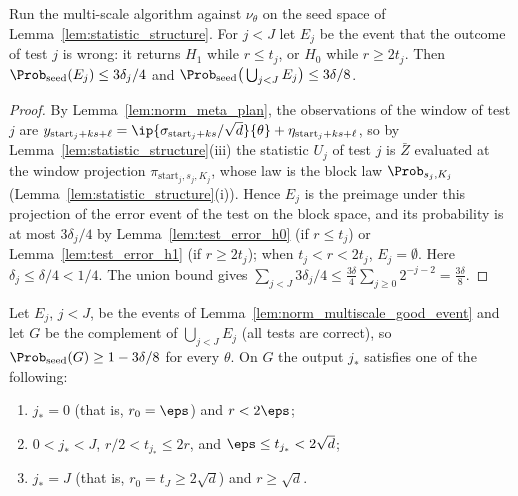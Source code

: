 \begin{lemma}\label{lem:norm_multiscale_good_event}
\leanok
{}
Run the multi-scale algorithm against $\nu_\theta$ on the seed space of
Lemma~\ref{lem:statistic_structure}. For $j < J$ let $E_j$ be the event that the outcome of
test $j$ is wrong: it returns $H_1$ while $r \le t_j$, or $H_0$ while $r \ge 2t_j$.
Then $\Prob_{\mathrm{seed}}(E_j) \le 3\delta_j/4$ and
$\Prob_{\mathrm{seed}}\big( \bigcup_{j<J} E_j \big) \le 3\delta/8$.
\end{lemma}

\begin{proof}
\leanok
{}
By Lemma~\ref{lem:norm_meta_plan}, the observations of the window of test $j$ are
$y_{\mathrm{start}_j + ks + \ell} = \ip{\sigma_{\mathrm{start}_j+ks}/\sqrt d}{\theta}
+ \eta_{\mathrm{start}_j+ks+\ell}$, so by Lemma~\ref{lem:statistic_structure}(iii) the
statistic $U_j$ of test $j$ is $\bar Z$ evaluated at the window projection
$\pi_{\mathrm{start}_j, s_j, K_j}$, whose law is the block law $\Prob_{s_j,K_j}$
(Lemma~\ref{lem:statistic_structure}(i)). Hence $E_j$ is the preimage under this
projection of the error event of the test on the block space, and its probability is at
most $3\delta_j/4$ by Lemma~\ref{lem:test_error_h0} (if $r \le t_j$) or
Lemma~\ref{lem:test_error_h1} (if $r \ge 2t_j$); when $t_j < r < 2t_j$, $E_j = \emptyset$.
Here $\delta_j \le \delta/4 < 1/4$. The union bound gives
$\sum_{j<J} 3\delta_j/4 \le \frac{3\delta}{4}\sum_{j\ge0}2^{-j-2} = \frac{3\delta}{8}$.
\end{proof}

\begin{theorem}\label{thm:multiscale_guarantee}
\leanok
{}
Let $E_j$, $j < J$, be the events of Lemma~\ref{lem:norm_multiscale_good_event} and let $G$
be the complement of $\bigcup_{j<J}E_j$ (all tests are correct), so
$\Prob_{\mathrm{seed}}(G) \ge 1 - 3\delta/8$ for every $\theta$. On $G$ the output $j_*$
satisfies one of the following:
\begin{enumerate}
  \item[(a)] $j_* = 0$ (that is, $r_0 = \eps$) and $r < 2\eps$;
  \item[(b)] $0 < j_* < J$, $r/2 < t_{j_*} \le 2r$, and $\eps \le t_{j_*} < 2\sqrt d$;
  \item[(c)] $j_* = J$ (that is, $r_0 = t_J \ge 2\sqrt d$) and $r \ge \sqrt d$.
\end{enumerate}
\end{theorem}

